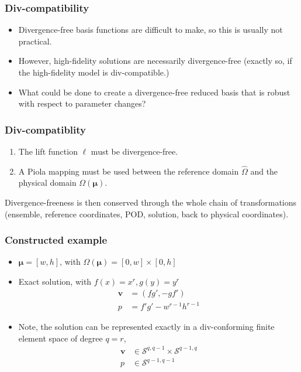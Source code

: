 \documentclass{beamer}
\begin{document}
\begin{frame}
  \frametitle{Div-compatibility}
  \begin{itemize}
  \item Divergence-free basis functions are difficult to make, so this is
    usually not practical.
  \item However, high-fidelity solutions are necessarily divergence-free
    (exactly so, if the high-fidelity model is div-compatible.)
  \item What could be done to create a divergence-free reduced basis that is
    robust with respect to parameter changes?
  \end{itemize}
\end{frame}

\begin{frame}
  \frametitle{Div-compatiblity}
  \begin{enumerate}
  \item The lift function $\bm \ell$ must be divergence-free.
  \item A Piola mapping must be used between the reference domain $\hat{\Omega}$
    and the physical domain $\Omega(\bm \mu)$.
  \end{enumerate}
  Divergence-freeness is then conserved through the whole chain of
  transformations (ensemble, reference coordinates, POD, solution, back to
  physical coordinates).
\end{frame}

\begin{frame}
  \frametitle{Constructed example}
  \begin{itemize}
  \item $\bm \mu = [w, h]$, with $\Omega(\bm \mu) = [0,w] \times [0,h]$
  \item Exact solution, with $f(x) = x^r, g(y) = y^r$
    \begin{align*}
      \bm v &= \left( fg', -gf' \right) \\
      p &= f'g' - w^{r-1}h^{r-1}
    \end{align*}
  \item Note, the solution can be represented exactly in a div-conforming finite
    element space of degree $q = r$,
    \begin{align*}
      \bm v &\in \mathcal{S}^{q,q-1} \times \mathcal{S}^{q-1,q} \\
      p &\in \mathcal{S}^{q-1,q-1}
    \end{align*}
  \end{itemize}
\end{frame}
\end{document}
